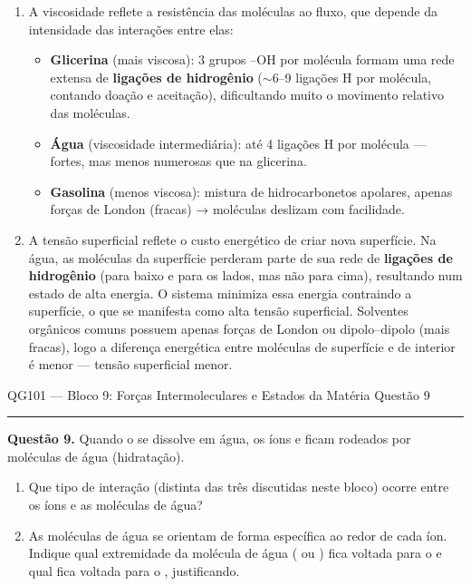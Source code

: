 \documentclass[10pt,a4paper]{article}
\newcommand{\questaoheader}[1]{%
  \begin{center}
  {\small\sffamily QG101 --- Bloco 9: Forças Intermoleculares e Estados da Matéria
  \hfill Questão #1}
  \end{center}
  \vspace{-0.3cm}
  \noindent\rule{\textwidth}{0.6pt}
  \vspace{0.1cm}
}
\begin{document}
\begin{enumerate}
  \item A viscosidade reflete a resistência das moléculas ao fluxo, que
        depende da intensidade das interações entre elas:
        \begin{itemize}
          \item \textbf{Glicerina} (mais viscosa): 3 grupos --OH por
                molécula formam uma rede extensa de \textbf{ligações de
                hidrogênio} ($\sim$6--9 ligações H por molécula, contando
                doação e aceitação), dificultando muito o movimento relativo
                das moléculas.
          \item \textbf{Água} (viscosidade intermediária): até 4 ligações H
                por molécula --- fortes, mas menos numerosas que na glicerina.
          \item \textbf{Gasolina} (menos viscosa): mistura de
                hidrocarbonetos apolares, apenas forças de London (fracas) →
                moléculas deslizam com facilidade.
        \end{itemize}

  \item A tensão superficial reflete o custo energético de criar nova
        superfície. Na água, as moléculas da superfície perderam parte de
        sua rede de \textbf{ligações de hidrogênio} (para baixo e para os
        lados, mas não para cima), resultando num estado de alta energia. O
        sistema minimiza essa energia contraindo a superfície, o que se
        manifesta como alta tensão superficial. Solventes orgânicos comuns
        possuem apenas forças de London ou dipolo--dipolo (mais fracas),
        logo a diferença energética entre moléculas de superfície e de
        interior é menor --- tensão superficial menor.
\end{enumerate}

\clearpage

\questaoheader{9}

\noindent\textbf{Questão 9.}
Quando o  se dissolve em água, os íons  e  ficam
rodeados por moléculas de água (hidratação).
\begin{enumerate}
  \item Que tipo de interação (distinta das três discutidas neste bloco)
        ocorre entre os íons e as moléculas de água?
  \item As moléculas de água se orientam de forma específica ao redor de
        cada íon. Indique qual extremidade da molécula de água
        ( ou ) fica voltada para o  e qual fica
        voltada para o , justificando.
\end{enumerate}
\end{document}
